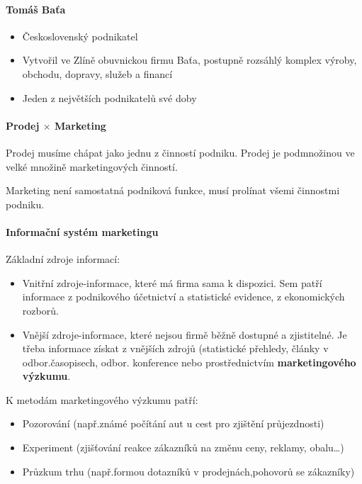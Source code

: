 \paragraph*{Tomáš Baťa}
    \begin{itemize}
        \item {Československý podnikatel}
        \item Vytvořil ve Zlíně obuvnickou firmu Baťa, postupně rozsáhlý komplex výroby, obchodu, dopravy, služeb a financí
        \item Jeden z největších podnikatelů své doby
    \end{itemize}

\paragraph*{Prodej $\times$ Marketing}
Prodej musíme chápat jako jednu z činností podniku. Prodej je podmnožinou ve velké množině marketingových činností.

Marketing není samostatná podniková funkce, musí prolínat všemi činnostmi podniku.

\paragraph*{Informační systém marketingu}
    Základní zdroje informací:
    \begin{itemize}
        \item Vnitřní zdroje-informace, které má firma sama k dispozici. Sem patří informace z podnikového účetnictví a statistické evidence, z ekonomických rozborů.
        \item Vnější zdroje-informace, které nejsou firmě běžně dostupné a zjistitelné. Je třeba informace získat z vnějších zdrojů (statistické přehledy, články v odbor.časopisech, odbor. konference nebo prostřednictvím \textbf{marketingového výzkumu}.
    \end{itemize}

K metodám marketingového výzkumu patří:
\begin{itemize}
    \item Pozorování (např.známé počítání aut u cest pro zjištění průjezdnosti)
    \item Experiment (zjišťování reakce zákazníků na změnu ceny, reklamy, obalu\ldots)
    \item Průzkum trhu (např.formou dotazníků v prodejnách,pohovorů se zákazníky)
\end{itemize}

